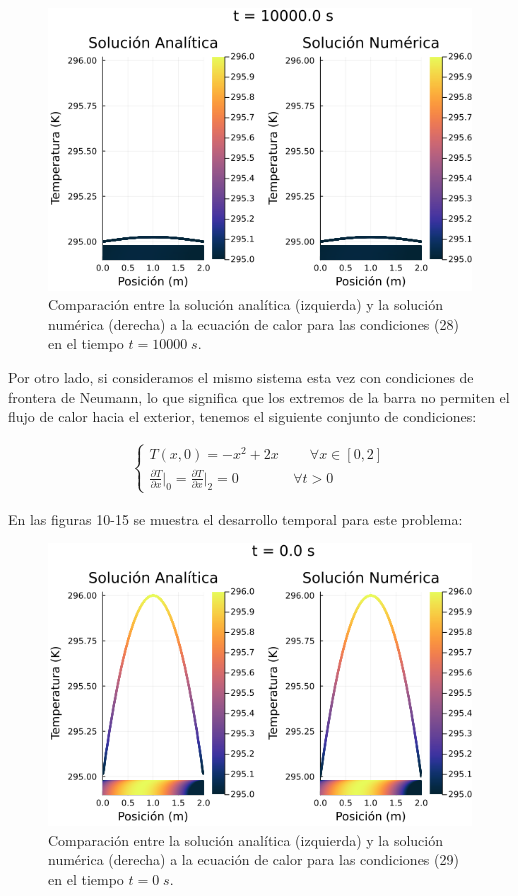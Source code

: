 \documentclass[12pt]{article}
\begin{document}
\begin{figure}[H]
\begin{center}
    \includegraphics[width=0.79\linewidth]{Ejemplo_01_t_6.png}
    \caption{Comparación entre la solución analítica (izquierda) y la solución numérica (derecha) a la ecuación de calor para las condiciones (28) en el tiempo $t=10000 \; s$.}
\end{center}
\end{figure}

Por otro lado, si consideramos el mismo sistema esta vez con condiciones de frontera de Neumann, lo que significa que los extremos de la barra no permiten el flujo de calor hacia el exterior, tenemos el siguiente conjunto de condiciones:

\begin{align}
    \begin{cases}
        T(x,0) = -x^2 + 2x \;\;\;\;\;\;\;\; \forall x \in [0,2]\\
        \frac{\partial T}{\partial x} \Big|_0 = \frac{\partial T}{\partial x} \Big|_2 = 0 \;\;\;\;\;\;\;\;\;\;\;\;\;\; \forall t>0
    \end{cases}
\end{align}

En las figuras 10-15 se muestra el desarrollo temporal para este problema:


\begin{figure}[H]
\begin{center}
    \includegraphics[width=0.79\linewidth]{Ejemplo_02_t_0.png}
    \caption{Comparación entre la solución analítica (izquierda) y la solución numérica (derecha) a la ecuación de calor para las condiciones (29) en el tiempo $t=0 \; s$.}
\end{center}
\end{figure}
\end{document}
